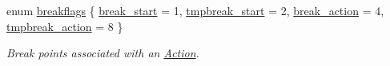 \begin{DoxyCompactItemize}
enum \mbox{\hyperlink{class_action_a4c96e5f79efa1824d4d72a3cab8f4ecb}{breakflags}} \{ \mbox{\hyperlink{class_action_a4c96e5f79efa1824d4d72a3cab8f4ecba63998357295314ce39d797e78e0b1579}{break\+\_\+start}} = 1, 
\mbox{\hyperlink{class_action_a4c96e5f79efa1824d4d72a3cab8f4ecbaffd45b3deedb473cdf0d3437e8a569e6}{tmpbreak\+\_\+start}} = 2, 
\mbox{\hyperlink{class_action_a4c96e5f79efa1824d4d72a3cab8f4ecba2c917c9e8e753add3f8b500652bbc368}{break\+\_\+action}} = 4, 
\mbox{\hyperlink{class_action_a4c96e5f79efa1824d4d72a3cab8f4ecba04e778a70d8ae585302b8607f6608da6}{tmpbreak\+\_\+action}} = 8
 \}
\begin{DoxyCompactList}\small\item\em Break points associated with an \mbox{\hyperlink{class_action}{Action}}. \end{DoxyCompactList}\end{DoxyCompactItemize}

